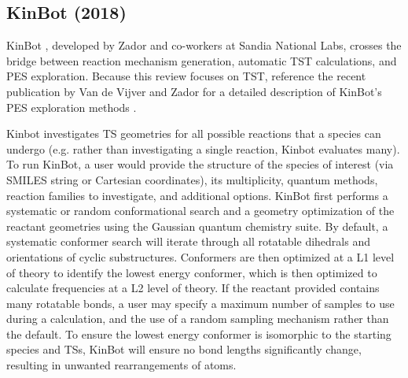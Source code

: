 \documentclass[preprint, 11pt]{elsarticle} %
\begin{document}

\subsection{KinBot (2018)}


KinBot \cite{kinbot:2018, kinbot:2019}, developed by Zador and co-workers at Sandia National Labs, crosses the bridge between reaction mechanism generation, automatic TST calculations, and PES exploration.
Because this review focuses on TST, reference the recent publication by Van de Vijver and Zador for a detailed description of KinBot's PES exploration methods \cite{kinbot:2019}.

Kinbot investigates TS geometries for all possible reactions that a species can undergo (e.g. rather than investigating a single reaction, Kinbot evaluates many).
To run KinBot, a user would provide the structure of the species of interest (via SMILES string or Cartesian coordinates), its multiplicity, quantum methods, reaction families to investigate, and additional options. 
KinBot first performs a systematic or random conformational search and a geometry optimization of the reactant geometries using the Gaussian quantum chemistry suite.
By default, a systematic conformer search will iterate through all rotatable dihedrals and orientations of cyclic substructures. 
Conformers are then optimized at a L1 level of theory to identify the lowest energy conformer, which is then optimized to calculate frequencies at a L2 level of theory.
If the reactant provided contains many rotatable bonds, a user may specify a maximum number of samples to use during a calculation, and the use of a random sampling mechanism rather than the default.
To ensure the lowest energy conformer is isomorphic to the starting species and TSs, KinBot will ensure no bond lengths significantly change, resulting in unwanted rearrangements of atoms.
\end{document}
